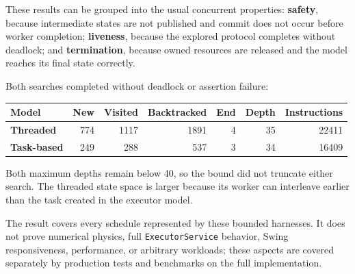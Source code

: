 These results can be grouped into the usual concurrent properties:
\textbf{safety}, because intermediate states are not published and commit does
not occur before worker completion; \textbf{liveness}, because the explored
protocol completes without deadlock; and \textbf{termination}, because owned
resources are released and the model reaches its final state correctly.

Both searches completed without deadlock or assertion failure:

\begin{center}
\begin{tabular}{|>{\bfseries}p{2.4cm}|r|r|r|r|r|r|}
    \hline
    Model & New & Visited & Backtracked & End & Depth & Instructions \\
    \hline
    Threaded & 774 & 1117 & 1891 & 4 & 35 & 22411 \\
    \hline
    Task-based & 249 & 288 & 537 & 3 & 34 & 16409 \\
    \hline
\end{tabular}
\end{center}

Both maximum depths remain below 40, so the bound did not truncate either
search. The threaded state space is larger because its worker can interleave
earlier than the task created in the executor model.

The result covers every schedule represented by these bounded harnesses. It
does not prove numerical physics, full \texttt{ExecutorService} behavior,
Swing responsiveness, performance, or arbitrary workloads; these aspects are
covered separately by production tests and benchmarks on the full
implementation.
